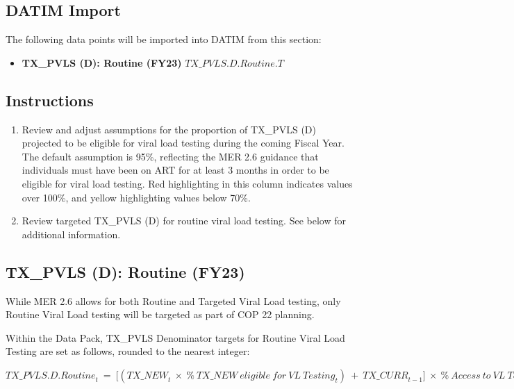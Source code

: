 \documentclass[
  openany]{book}
\providecommand{\tightlist}{%
  \setlength{\itemsep}{0pt}\setlength{\parskip}{0pt}}
\begin{document}
\hypertarget{datim-import-4}{%
\subsection{DATIM Import}\label{datim-import-4}}

The following data points will be imported into DATIM from this section:

\begin{itemize}
\tightlist
\item
  \textbf{TX\_PVLS (D): Routine (FY23)} \(TX\_PVLS.D.Routine.T\)
\end{itemize}

\hypertarget{instructions-4}{%
\subsection{Instructions}\label{instructions-4}}

\begin{enumerate}
\def\labelenumi{\arabic{enumi}.}
\item
  Review and adjust assumptions for the proportion of TX\_PVLS (D)
  projected to be eligible for viral load testing during the coming
  Fiscal Year. The default assumption is 95\%, reflecting the MER 2.6
  guidance that individuals must have been on ART for at least 3
  months in order to be eligible for viral load testing. Red
  highlighting in this column indicates values over 100\%, and yellow
  highlighting values below 70\%.
\item
  Review targeted TX\_PVLS (D) for routine viral load testing. See
  below for additional information.
\end{enumerate}

\hypertarget{tx_pvls-d-routine-fy23}{%
\subsection{TX\_PVLS (D): Routine (FY23)}\label{tx_pvls-d-routine-fy23}}

While MER 2.6 allows for both Routine and Targeted Viral Load testing,
only Routine Viral Load testing will be targeted as part of COP 22
planning.

Within the Data Pack, TX\_PVLS Denominator targets for Routine Viral Load
Testing are set as follows, rounded to the nearest integer:

\begin{center} ${TX\_ PVLS.D.Routine}_{t}\  = \ \lbrack({TX\_ NEW}_{t}\  \times \ {\%\ TX\_ NEW\ eligible\ for\ VL\ Testing}_{t})\  + \ {TX\_ CURR}_{t - 1}\rbrack\  \times \ {\%\ Access\ to\ VL\ Testing}_{t}$ \end{center}
\end{document}
